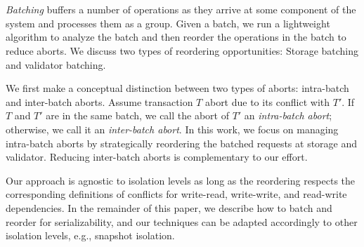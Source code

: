 \section{}\label{sec:overview}


\emph{Batching} buffers a number of operations as they arrive at some component of the system and processes them as a group. 
Given a batch, we run a lightweight algorithm to analyze the batch and then reorder the operations in the batch to reduce aborts. We discuss two types of reordering opportunities: Storage batching and validator batching.

We first make a conceptual distinction between two types of aborts: intra-batch and inter-batch aborts. Assume transaction $T$ abort due to its conflict with $T'$. If $T$ and $T'$ are in the same batch, we call the abort of $T'$ an \emph{intra-batch abort}; otherwise, we call it an \emph{inter-batch abort}.
In this work, we focus on managing intra-batch aborts by strategically reordering the batched requests at storage and validator. 
Reducing inter-batch aborts is complementary to our effort. 

Our approach is agnostic to isolation levels as long as the reordering respects the corresponding definitions of conflicts for 
write-read, write-write, and read-write dependencies. In the remainder of this paper, we describe 
how to batch and reorder for serializability, and our techniques can be adapted accordingly to other isolation levels, e.g., snapshot isolation.


